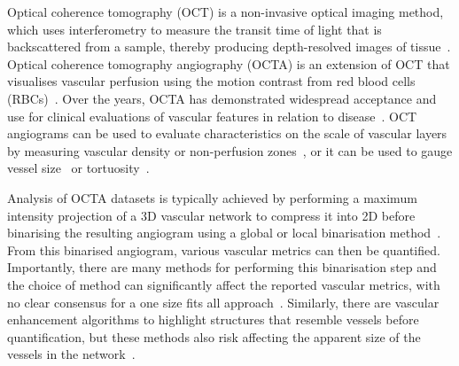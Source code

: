 Optical coherence tomography (OCT) is a non-invasive optical imaging method, which uses interferometry to measure the transit time of light that is backscattered from a sample, thereby producing depth-resolved images of tissue~\cite{huangOpticalCoherenceTomography1991,fercherVivoOpticalCoherence1993}. Optical coherence tomography angiography (OCTA) is an extension of OCT that visualises vascular perfusion using the motion contrast from red blood cells (RBCs)~\cite{makitaOpticalCoherenceAngiography2006,srinivasanRapidVolumetricAngiography2010,taoSinglepassVolumetricBidirectional2008,wangThreeDimensionalOptical2007}. Over the years, OCTA has demonstrated widespread acceptance and use for clinical evaluations of vascular features in relation to disease~\cite{javedOpticalCoherenceTomography2023}. OCT angiograms can be used to evaluate characteristics on the scale of vascular layers by measuring vascular density or non-perfusion zones~\cite{tanApproachesQuantifyOptical2020,hwangVisualization3Distinct2016,coscasOpticalCoherenceTomography2016,takusagawaProjectionResolvedOptical2017,zabelComparisonRetinalMicrovasculature2019,tanApplicationOpticalCoherence2021}, or it can be used to gauge vessel size~\cite{yaoComparisonRetinalVessel2021} or tortuosity~\cite{leeQUANTIFICATIONRETINALVESSEL2018}.

Analysis of OCTA datasets is typically achieved by performing a maximum intensity projection of a 3D vascular network to compress it into 2D before binarising the resulting angiogram using a global or local binarisation method~\cite{sampsonTowardsStandardizingRetinal2022,untrachtTowardsStandardisingRetinal2024}. From this binarised angiogram, various vascular metrics can then be quantified. Importantly, there are many methods for performing this binarisation step and the choice of method can significantly affect the reported vascular metrics, with no clear consensus for a one size fits all approach~\cite{mehtaImpactBinarizationThresholding2019,rabioloComparisonMethodsQuantify2018,borrelliOPTICALCOHERENCETOMOGRAPHY2021,freedmanImpactImageProcessing2022,arrigoImpactDifferentThresholds2021}. Similarly, there are vascular enhancement algorithms to highlight structures that resemble vessels before quantification, but these methods also risk affecting the apparent size of the vessels in the network~\cite{freedmanImpactImageProcessing2022,hongIntrasessionRepeatabilityQuantitative2020,hongEffectVesselEnhancement2020}.

